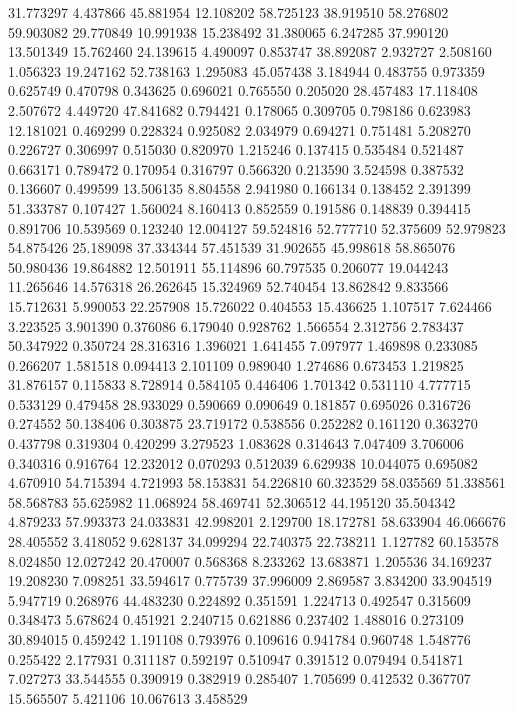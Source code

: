 31.773297
4.437866
45.881954
12.108202
58.725123
38.919510
58.276802
59.903082
29.770849
10.991938
15.238492
31.380065
6.247285
37.990120
13.501349
15.762460
24.139615
4.490097
0.853747
38.892087
2.932727
2.508160
1.056323
19.247162
52.738163
1.295083
45.057438
3.184944
0.483755
0.973359
0.625749
0.470798
0.343625
0.696021
0.765550
0.205020
28.457483
17.118408
2.507672
4.449720
47.841682
0.794421
0.178065
0.309705
0.798186
0.623983
12.181021
0.469299
0.228324
0.925082
2.034979
0.694271
0.751481
5.208270
0.226727
0.306997
0.515030
0.820970
1.215246
0.137415
0.535484
0.521487
0.663171
0.789472
0.170954
0.316797
0.566320
0.213590
3.524598
0.387532
0.136607
0.499599
13.506135
8.804558
2.941980
0.166134
0.138452
2.391399
51.333787
0.107427
1.560024
8.160413
0.852559
0.191586
0.148839
0.394415
0.891706
10.539569
0.123240
12.004127
59.524816
52.777710
52.375609
52.979823
54.875426
25.189098
37.334344
57.451539
31.902655
45.998618
58.865076
50.980436
19.864882
12.501911
55.114896
60.797535
0.206077
19.044243
11.265646
14.576318
26.262645
15.324969
52.740454
13.862842
9.833566
15.712631
5.990053
22.257908
15.726022
0.404553
15.436625
1.107517
7.624466
3.223525
3.901390
0.376086
6.179040
0.928762
1.566554
2.312756
2.783437
50.347922
0.350724
28.316316
1.396021
1.641455
7.097977
1.469898
0.233085
0.266207
1.581518
0.094413
2.101109
0.989040
1.274686
0.673453
1.219825
31.876157
0.115833
8.728914
0.584105
0.446406
1.701342
0.531110
4.777715
0.533129
0.479458
28.933029
0.590669
0.090649
0.181857
0.695026
0.316726
0.274552
50.138406
0.303875
23.719172
0.538556
0.252282
0.161120
0.363270
0.437798
0.319304
0.420299
3.279523
1.083628
0.314643
7.047409
3.706006
0.340316
0.916764
12.232012
0.070293
0.512039
6.629938
10.044075
0.695082
4.670910
54.715394
4.721993
58.153831
54.226810
60.323529
58.035569
51.338561
58.568783
55.625982
11.068924
58.469741
52.306512
44.195120
35.504342
4.879233
57.993373
24.033831
42.998201
2.129700
18.172781
58.633904
46.066676
28.405552
3.418052
9.628137
34.099294
22.740375
22.738211
1.127782
60.153578
8.024850
12.027242
20.470007
0.568368
8.233262
13.683871
1.205536
34.169237
19.208230
7.098251
33.594617
0.775739
37.996009
2.869587
3.834200
33.904519
5.947719
0.268976
44.483230
0.224892
0.351591
1.224713
0.492547
0.315609
0.348473
5.678624
0.451921
2.240715
0.621886
0.237402
1.488016
0.273109
30.894015
0.459242
1.191108
0.793976
0.109616
0.941784
0.960748
1.548776
0.255422
2.177931
0.311187
0.592197
0.510947
0.391512
0.079494
0.541871
7.027273
33.544555
0.390919
0.382919
0.285407
1.705699
0.412532
0.367707
15.565507
5.421106
10.067613
3.458529

